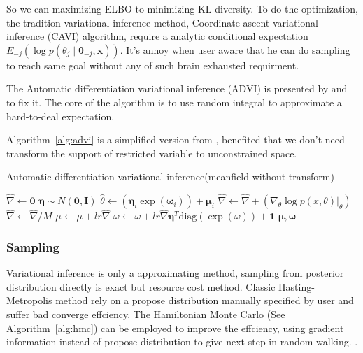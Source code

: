 \documentclass{article}
\begin{document}
So we can maximizing ELBO to minimizing KL diversity. 
To do the optimization, the tradition variational inference method, 
Coordinate ascent variational inference (CAVI) algorithm,
require a analytic conditional expectation $E_{-j}(\log p(\theta_j \mid \mathbf{\theta}_{-j},\mathbf{x}))$. 
It's annoy when user aware that he can do sampling to
reach same goal without any of such brain exhausted requirment. 

The Automatic differentiation variational inference (ADVI) is presented by 
\cite{kucukelbir2017automatic} and \cite{kucukelbir2014fully}
to fix it. The core of the algorithm is to use random integral to approximate a hard-to-deal expectation.


Algorithm~\ref{alg:advi} is a simplified version from \cite{kucukelbir2017automatic}, benefited that we don't need transform
the support of restricted variable to unconstrained space.

\begin{algorithm}
\caption{Automatic differentiation variational inference(meanfield without transform)}
\begin{algorithmic}[1]
        \State $\hat{\nabla} \gets \mathbf{0}$
        \State $\mathbf{\eta} \sim N(\mathbf{0},\mathbf{I}) $
            \State $\hat{\theta} \gets (\mathbf{\eta}_i \exp(\mathbf{\omega}_i)) + \mathbf{\mu}_i$
            \State $\hat{\nabla} \gets \hat{\nabla} + (\nabla_\theta \log p(x,\theta)|_{\hat{\theta}})$
        \EndFor
        \State $\hat{\nabla} \gets \hat{\nabla} / M$
        \State $\mu \gets \mu + lr \hat{\nabla}$
        \State $\omega \gets \omega + lr \hat{\nabla} \mathbf{\eta}^T \mathrm{diag}({\exp(\omega)}) + \mathbf{1}$
    \EndFor 
    \State \Return $\mathbf{\mu},\mathbf{\omega}$
\EndProcedure
\end{algorithmic}
\label{alg:advi}
\end{algorithm}


\subsubsection{Sampling}

Variational inference is only a approximating method, 
sampling from posterior distribution directly is exact but resource cost method. 
Classic Hasting-Metropolis method rely on a propose distribution manually specified by user
and suffer bad converge effciency. 
The Hamiltonian Monte Carlo \cite{hoffman2014no} (See Algorithm~\ref{alg:hmc}) can be employed to improve the effciency,
using gradient information instead of propose distribution to give next step in random walking. .
\end{document}
